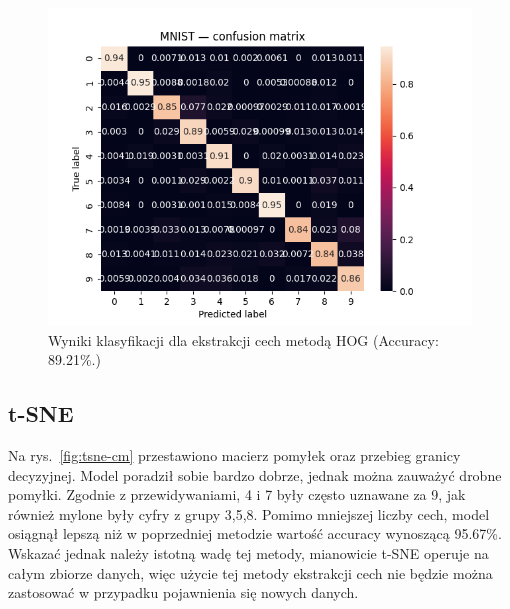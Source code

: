 \documentclass[10pt]{article}
\begin{document}
\begin{figure}[H]
    \centering
    \includegraphics[width=.5\linewidth]{img/mnist_hog_cm.png}
    \caption{Wyniki klasyfikacji dla ekstrakcji cech metodą HOG (Accuracy: 89.21\%.)}\label{fig:hog-cm}
\end{figure}

\subsection*{t-SNE}

Na rys.~\ref{fig:tsne-cm} przestawiono macierz pomyłek oraz przebieg granicy decyzyjnej.
Model poradził sobie bardzo dobrze, jednak można zauważyć drobne pomyłki.
Zgodnie z przewidywaniami, 4 i 7 były często uznawane za 9, jak również mylone były cyfry z grupy 3,5,8.
Pomimo mniejszej liczby cech, model osiągnął lepszą niż w poprzedniej metodzie wartość accuracy wynoszącą 95.67\%.
Wskazać jednak należy istotną wadę tej metody, mianowicie t-SNE operuje na całym zbiorze danych, więc użycie tej metody
ekstrakcji cech nie będzie można zastosować w przypadku pojawnienia się nowych danych.
\end{document}
